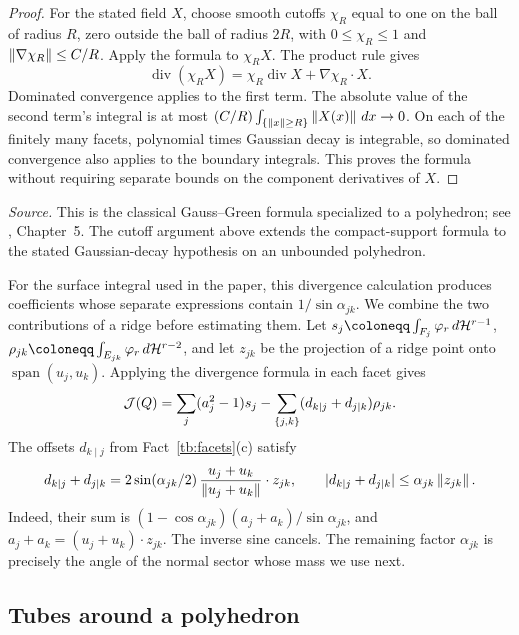 \begin{proof}
For the stated field \(X\), choose smooth cutoffs \(\chi_R\) equal to
one on the ball of radius \(R\), zero outside the ball of radius
\(2R\), with \(0\le\chi_R\le1\) and
\(\left\lVert\nabla\chi_R\right\rVert\le C/R\). Apply the formula to \(\chi_RX\).
The product rule gives
\[
 \operatorname{div}(\chi_RX)
 =\chi_R\operatorname{div}X+\nabla\chi_R\cdot X.
\]
Dominated convergence applies to the first term. The absolute value
of the second term's integral is at most
\((C/R)\int_{\{\left\lVert x\right\rVert\ge R\}}\left\lVert X(x)\right\rVert\,dx\to0\).
On each of the finitely many facets, polynomial times Gaussian decay
is integrable, so dominated convergence also applies to the boundary
integrals. This proves the formula without requiring separate bounds
on the component derivatives of \(X\).
\end{proof}

\emph{Source.} This is the classical Gauss--Green formula specialized
to a polyhedron; see , Chapter~5. The cutoff argument above
extends the compact-support formula to the stated Gaussian-decay
hypothesis on an unbounded polyhedron.

For the surface integral used in the paper, this divergence
calculation produces coefficients whose separate expressions contain
\(1/\sin\alpha_{jk}\). We combine the two contributions of a ridge
before estimating them. Let
\(s_j\coloneqq \int_{F_j}\varphi_r\,d\Haus^{r-1}\),
\(\rho_{jk}\coloneqq \int_{E_{jk}}\varphi_r\,d\Haus^{r-2}\), and let
\(z_{jk}\) be the projection of a ridge point onto
\(\operatorname{span}(u_j,u_k)\). Applying the divergence formula in
each facet gives
\[
 \mathcal J(Q)=\sum_j(a_j^2-1)s_j
       -\sum_{\{j,k\}}(d_{k\mid j}+d_{j\mid k})\rho_{jk}.
\]
The offsets \(d_{k\mid j}\) from Fact~\ref{tb:facets}(c) satisfy
\[
 d_{k\mid j}+d_{j\mid k}
 =2\sin(\alpha_{jk}/2)\,
       \frac{u_j+u_k}{\left\lVert u_j+u_k\right\rVert}\cdot z_{jk},\qquad
 |d_{k\mid j}+d_{j\mid k}|\le\alpha_{jk}\left\lVert z_{jk}\right\rVert.
\]
Indeed, their sum is
\((1-\cos\alpha_{jk})(a_j+a_k)/\sin\alpha_{jk}\), and
\(a_j+a_k=(u_j+u_k)\cdot z_{jk}\).
The inverse sine cancels. The remaining factor \(\alpha_{jk}\)
is precisely the angle of the normal sector whose mass we use next.

\subsection{Tubes around a polyhedron}\label{tb:sec:tubes}


